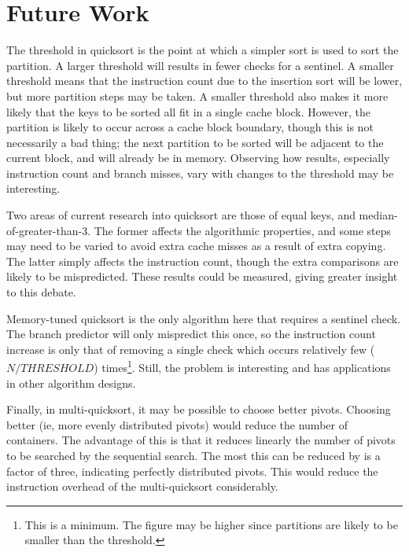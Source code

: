 \section{Future Work}
The threshold in quicksort is the point at which a simpler sort is used to sort
the partition. A larger threshold will results in fewer checks for a sentinel. A
smaller threshold means that the instruction count due to the insertion sort
will be lower, but more partition steps may be taken. A smaller threshold also
makes it more likely that the keys to be sorted all fit in a single cache
block. However, the partition is likely to occur across a cache block boundary,
though this is not necessarily a bad thing; the next partition to be sorted will
be adjacent to the current block, and will already be in memory. Observing how
results, especially instruction count and branch misses, vary with changes 
to the threshold may be interesting.

Two areas of current research into quicksort are those of equal keys, and
median-of-greater-than-3. The former affects the algorithmic properties, and
some steps may need to be varied to avoid extra cache misses as a result
of extra copying. The latter simply affects the instruction count, though the
extra comparisons are likely to be mispredicted. These results could be
measured, giving greater insight to this debate.

Memory-tuned quicksort is the only algorithm here that requires a sentinel
check. The branch predictor will only mispredict this once, so the instruction
count increase is only that of removing a single check which occurs relatively
few ($N / THRESHOLD$) times\footnote{This is a minimum. The figure may be higher
since partitions are likely to be smaller than the threshold.}. Still, the
problem is interesting and has applications in other algorithm designs.

Finally, in multi-quicksort, it may be possible to choose better pivots.
Choosing better (ie, more evenly distributed pivots) would reduce the number of
containers. The advantage of this is that it reduces linearly the number of
pivots to be searched by the sequential search. The most this can be reduced by
is a factor of three, indicating perfectly distributed pivots. This would reduce
the instruction overhead of the multi-quicksort considerably.
